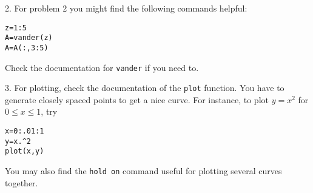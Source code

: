 \documentclass[12pt]{report}
\begin{document}
2. For problem 2 you might find the following commands helpful:
\begin{verbatim}
z=1:5
A=vander(z)
A=A(:,3:5)
\end{verbatim}
Check the documentation for {\tt vander} if you need to.

3. For plotting, check the documentation of the {\tt plot} function. You have to generate closely spaced points to get a nice curve. For instance, to plot $y=x^2$
for $0\le x\le 1$, try 
\begin{verbatim}
x=0:.01:1
y=x.^2
plot(x,y)
\end{verbatim}

You may also find the {\tt hold on} command useful for plotting several curves together. 
\end{document}
